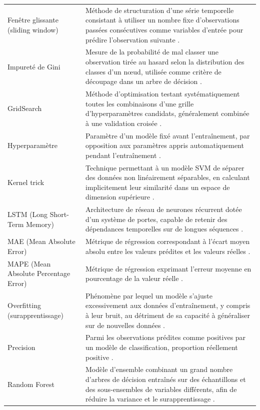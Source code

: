 \documentclass[a4paper,12pt, oneside]{article}
\begin{document}
\begin{longtable}{@{}p{4cm}p{13cm}@{}}
Fenêtre glissante (sliding window) & Méthode de structuration d'une série temporelle consistant à utiliser un nombre fixe d'observations passées consécutives comme variables d'entrée pour prédire l'observation suivante \cite{fpp3}. \\[24pt]
Impureté de Gini & Mesure de la probabilité de mal classer une observation tirée au hasard selon la distribution des classes d'un nœud, utilisée comme critère de découpage dans un arbre de décision \cite{scikitlearn}. \\[24pt]
GridSearch & Méthode d'optimisation testant systématiquement toutes les combinaisons d'une grille d'hyperparamètres candidats, généralement combinée à une validation croisée \cite{scikitlearn}. \\[24pt]
Hyperparamètre & Paramètre d'un modèle fixé avant l'entraînement, par opposition aux paramètres appris automatiquement pendant l'entraînement \cite{scikitlearn}. \\[24pt]
Kernel trick & Technique permettant à un modèle SVM de séparer des données non linéairement séparables, en calculant implicitement leur similarité dans un espace de dimension supérieure \cite{cortesvapnik1995}. \\[24pt]
LSTM (Long Short-Term Memory) & Architecture de réseau de neurones récurrent dotée d'un système de portes, capable de retenir des dépendances temporelles sur de longues séquences \cite{hochreiter1997}. \\[24pt]
MAE (Mean Absolute Error) & Métrique de régression correspondant à l'écart moyen absolu entre les valeurs prédites et les valeurs réelles \cite{scikitlearn}. \\[24pt]
MAPE (Mean Absolute Percentage Error) & Métrique de régression exprimant l'erreur moyenne en pourcentage de la valeur réelle \cite{fpp3}. \\[24pt]
Overfitting (surapprentissage) & Phénomène par lequel un modèle s'ajuste excessivement aux données d'entraînement, y compris à leur bruit, au détriment de sa capacité à généraliser sur de nouvelles données \cite{scikitlearn}. \\[24pt]
Precision & Parmi les observations prédites comme positives par un modèle de classification, proportion réellement positive \cite{scikitlearn}. \\[36pt]
Random Forest & Modèle d'ensemble combinant un grand nombre d'arbres de décision entraînés sur des échantillons et des sous-ensembles de variables différents, afin de réduire la variance et le surapprentissage \cite{breiman2001}. \\[24pt]

\end{longtable}
\end{document}
